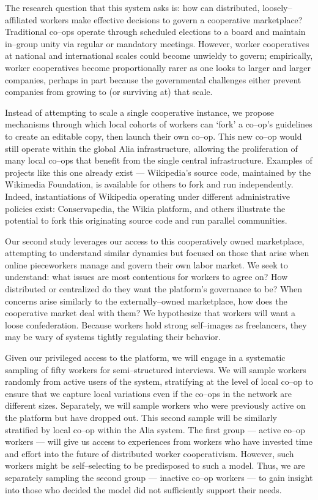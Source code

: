\documentclass[11pt]{article}
\begin{document}
The research question that this system asks is:
  how can distributed,
  loosely--affiliated workers
  make effective decisions to govern a cooperative marketplace?
Traditional co--ops operate through scheduled elections to a board and maintain
in--group unity via regular or mandatory meetings.
However,
worker cooperatives at national and international scales could become unwieldy to govern;
empirically,
worker cooperatives become proportionally rarer as one looks to larger and larger companies,
perhaps in part because the governmental challenges either prevent companies from growing to
(or surviving at)
that scale.

Instead of attempting to scale a single cooperative instance,
we propose mechanisms through which local cohorts of workers can `fork' a co--op's guidelines
to create an editable copy, then launch their own co--op.
This new co--op would still operate within the global Alia infrastructure,
allowing the proliferation of many local co--ops that benefit from the single central infrastructure.
Examples of projects like this one already exist
--- Wikipedia’s source code,
maintained by the Wikimedia Foundation,
is available for others to fork and run independently.
Indeed,
instantiations of Wikipedia operating under different administrative policies exist:
Conservapedia,
the Wikia platform, and
others illustrate the potential to fork this originating source code and run parallel communities.

Our second study leverages our access to this cooperatively owned marketplace,
attempting to understand similar dynamics but
focused on those that arise when online pieceworkers
manage and
govern their own labor market.
We seek to understand:
what issues are most contentious for workers to agree on?
How distributed or centralized do they want the platform's governance to be?
When concerns arise similarly to the externally--owned marketplace,
how does the cooperative market deal with them?
We hypothesize that workers will want a loose confederation.
Because workers hold strong self--images as freelancers,
they may be wary of systems tightly regulating their behavior.

Given our privileged access to the platform,
we will engage in a systematic sampling of fifty workers for semi--structured interviews.
We will sample workers randomly from active users of the system,
stratifying at the level of local co--op to ensure that
we capture local variations even if the co--ops in the network are different sizes.
Separately, we will sample workers who were previously active on the platform but have dropped out.
This second sample will be similarly stratified by local co--op within the Alia system.
The first group
--- active co--op workers ---
will give us access to experiences from workers
who have invested time and effort into the future of distributed worker cooperativism.
However, such workers might be self--selecting to be predisposed to such a model.
Thus, we are separately sampling the second group
--- inactive co--op workers ---
to gain insight into those who decided the model did not sufficiently support their needs.
\end{document}
